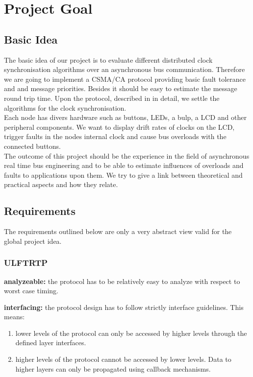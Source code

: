 \section{Project Goal}

\subsection{Basic Idea}
The basic idea of our project is to evaluate different distributed clock synchronisation algorithms over an 
asynchronous bus communication. Therefore we are going to implement a CSMA/CA protocol providing basic fault 
tolerance and and message priorities. Besides it should be easy to estimate the message round trip time.
Upon the protocol, described in \cite[NESD2]{NESD2} in detail, we settle the algorithms for the clock synchronisation.\\

Each node has divers hardware such as buttons, LEDs, a bulp, a LCD and other peripheral components. 
We want to display drift rates of clocks on the LCD, trigger faults in the nodes internal clock and  
cause bus overloads with the connected buttons.\\

The outcome of this project should be the experience in the field of asynchronous real time bus engineering and 
to be able to estimate influences of overloads and faults to applications upon them.
We try to give a link between theoretical and practical aspects and how they relate.


\subsection{Requirements}
The requirements outlined below are only a very abstract view valid for the global project idea.

\subsubsection{ULFTRTP}
\begin{req}
\label{req:ulftrtp:analyzeable}
\textbf{analyzeable: }the protocol has to be relatively easy to analyze with respect to worst case timing.
\end{req}

\begin{req}
\label{req:ulftrtp:interfacing}
\textbf{interfacing: }the protocol design has to follow strictly interface guidelines. This means:
\begin{enumerate}
 \item lower levels of the protocol can only be accessed by higher levels through the defined layer interfaces.
 \item higher levels of the protocol cannot be accessed by lower levels. Data to higher layers can only be propagated using callback mechanisms. 
\end{enumerate}

\end{req}

